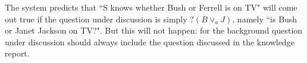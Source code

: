 The system predicts that ``S knows whether Bush or Ferrell is on
TV" will come out true if the question under discussion is simply
$?(B\vee_a J)$, namely ``is Bush or Janet Jackson on TV?". But
this will not happen: for the background question under discussion
should always include the question discussed in the knowledge
report.











